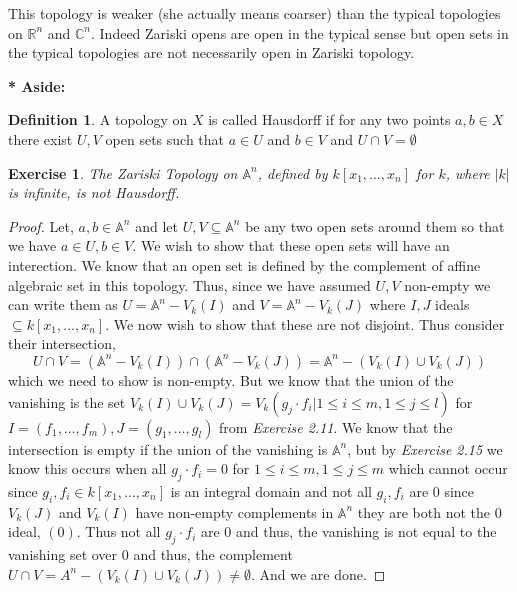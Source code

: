 \documentclass[11pt,a4paper]{article}
\newenvironment{asidebar}{%
    \def\FrameCommand{\vrule width 1.5pt \hspace{8pt}}%
    \MakeFramed{\advance\hsize-\width\FrameRestore}%
}{\endMakeFramed}
\newcommand{\aside}[1]{\begin{asidebar}\noindent\textbf{* Aside:} #1\end{asidebar}}
\theoremstyle{plain}
\newtheorem{exercise}[theorem]{Exercise}
\theoremstyle{definition}
\newtheorem{definition}[theorem]{Definition}
\theoremstyle{remark}
\begin{document}
\noindent
This topology is weaker (she actually means coarser) than the typical topologies on $\mathbb{R}^n$ and $\mathbb{C}^n$. Indeed Zariski opens are open in the typical sense but open sets in the typical topologies are not necessarily open in Zariski topology. 

\aside{\begin{definition}
    A topology on $X$ is called Hausdorff if for any two points $a,b \in X$ there exist $U, V$ open sets such that $a \in U$ and $b\in V$ and $U \cap V = \emptyset$ 
\end{definition}}

\begin{exercise}
    The Zariski Topology on $\mathbb{A}^n$, defined by $k[x_1, \dots, x_n]$ for $k$, where $|k|$ is infinite, is not Hausdorff.
\end{exercise}

\begin{proof}
    Let, $a, b \in \mathbb{A}^n$ and let $U, V \subseteq \mathbb{A}^n$ be any two open sets around them so that we have $a \in U, b \in V$. We wish to show that these open sets will have an interection. We know that an open set is defined by the complement of affine algebraic set in this topology. Thus, since we have assumed $U,V$ non-empty we can write them as $U=\mathbb{A}^n - V_k(I)$ and $V=\mathbb{A}^n -V_k(J)$ where $I, J$ ideals $\subseteq k[x_1, \dots, x_n]$. We now wish to show that these are not disjoint. Thus consider their intersection, $$U \cap V = (\mathbb{A}^n - V_k(I)) \cap (\mathbb{A}^n - V_k(J)) = \mathbb{A}^n - (V_k(I) \cup V_k(J))$$ which we need to show is non-empty. But we know that the union of the vanishing is the set $V_k(I) \cup V_k(J) = V_k(g_j \cdot f_i | 1 \leq i \leq m, 1 \leq j \leq l)$ for $I = (f_1, \dots , f_m), J = (g_1, \dots, g_l)$ from \emph{Exercise 2.11}. We know that the intersection is empty if the union of the vanishing is $\mathbb{A}^n$, but by \emph{Exercise 2.15} we know this occurs when all $g_j \cdot f_i = 0$ for $ 1 \leq i \leq m, 1 \leq j \leq m $ which cannot occur since $g_i, f_i \in k[x_1, \dots, x_n]$ is an integral domain and not all $g_i, f_i$ are $0$ since $V_k(J)$ and $V_k(I)$ have non-empty complements in $\mathbb{A}^n$ they are both not the $0$ ideal, $(0)$. Thus not all $g_j \cdot f_i$ are $0$ and thus, the vanishing is not equal to the vanishing set over $0$ and thus, the complement $U \cap V = A^n - (V_k(I) \cup V_k(J)) \neq \emptyset$. And we are done. 
\end{proof}
\end{document}

